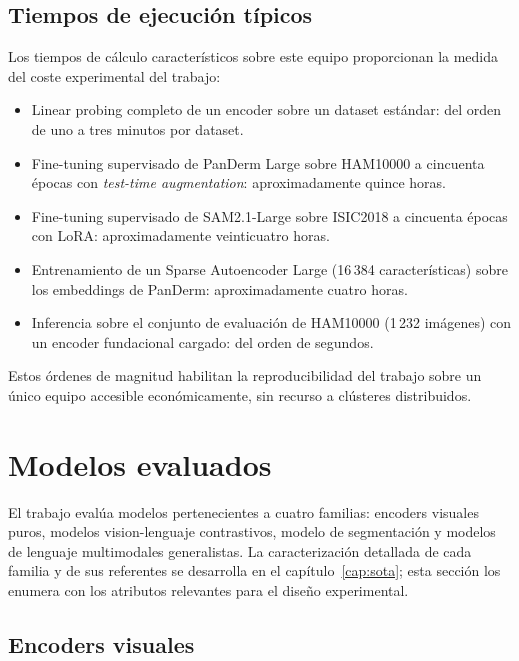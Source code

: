 \subsection{Tiempos de ejecución típicos}
\label{sec:hardware-tiempos}

Los tiempos de cálculo característicos sobre este equipo
proporcionan la medida del coste experimental del trabajo:

\begin{itemize}
\item Linear probing completo de un encoder sobre un dataset
estándar: del orden de uno a tres minutos por dataset.
\item Fine-tuning supervisado de PanDerm Large sobre HAM10000 a
cincuenta épocas con \emph{test-time augmentation}: aproximadamente
quince horas.
\item Fine-tuning supervisado de SAM2.1-Large sobre ISIC2018 a
cincuenta épocas con LoRA: aproximadamente veinticuatro horas.
\item Entrenamiento de un Sparse Autoencoder Large (16\,384
características) sobre los embeddings de PanDerm: aproximadamente
cuatro horas.
\item Inferencia sobre el conjunto de evaluación de HAM10000 (1\,232
imágenes) con un encoder fundacional cargado: del orden de
segundos.
\end{itemize}

Estos órdenes de magnitud habilitan la reproducibilidad del trabajo
sobre un único equipo accesible económicamente, sin recurso a
clústeres distribuidos.

\section{Modelos evaluados}
\label{sec:modelos-evaluados}

El trabajo evalúa modelos pertenecientes a cuatro familias: encoders
visuales puros, modelos vision-lenguaje contrastivos, modelo de
segmentación y modelos de lenguaje multimodales generalistas. La
caracterización detallada de cada familia y de sus referentes se
desarrolla en el capítulo~\ref{cap:sota}; esta sección los enumera
con los atributos relevantes para el diseño experimental.

\subsection{Encoders visuales}
\label{sec:modelos-encoders}

